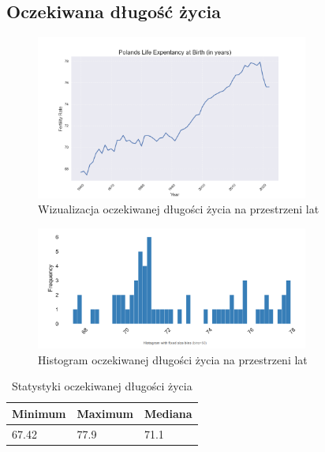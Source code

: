 \documentclass[11pt]{article}
\begin{document}
\subsection{Oczekiwana długość życia}
\begin{figure}[H]
        \centering
        \includegraphics[width=0.8\textwidth]{polish_life_expentancy.png}
        \caption{Wizualizacja oczekiwanej długości życia na przestrzeni lat}
\end{figure}
\begin{figure}[H]
        \centering
        \includegraphics[width=0.8\textwidth]{images/histogram_dl_zycia.png}
        \caption{Histogram oczekiwanej długości życia na przestrzeni lat}
\end{figure}
\begin{table}[H]
        \centering
        \begin{tabular}{|l|l|l|}
        \hline
        Minimum & Maximum & Mediana \\ \hline
        67.42 & 77.9 & 71.1 \\ \hline
        \end{tabular}
        \caption{Statystyki oczekiwanej długości życia}
        \end{table}
\end{document}
